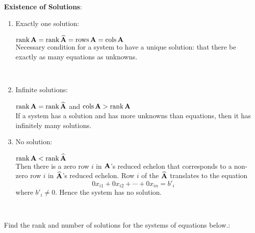 \documentclass[]{book}
\theoremstyle{definition}
\theoremstyle{definition}
\theoremstyle{definition}
\theoremstyle{remark}
\begin{document}
\textbf{Existence of Solutions}:

\begin{enumerate}
        \item \parbox[t]{1.75in}{Exactly one solution:}
            \parbox[t]{4in}{$\mbox{rank\,}{\bf A} = \mbox{rank\,} \widehat{\bf A}=\mbox{rows\,} {\bf A}  = \mbox{cols\,}{\bf A}$ \\
            [3pt] Necessary condition for a system to have a unique solution: that there be exactly as many equations as unknowns.}\\
    
        \item \parbox[t]{1.75in}{Infinite solutions:} \parbox[t]{4in}{$\mbox{rank\,} {\bf A}=\mbox{rank\,} \widehat{\bf A}$ and $\mbox{cols\,} {\bf A} > \mbox{rank\,} {\bf A}$\\
            [3pt] If a system has a solution and has more unknowns than equations, then it has infinitely many solutions.}

        \item \parbox[t]{1.75in}{No solution:} \parbox[t]{4in}{$\mbox{rank\,} {\bf A} < \mbox{rank\,} \widehat{\bf A}$ \\
        [3pt] Then there is a zero row $i$ in $\bf A$'s reduced echelon that corresponds to a non-zero row $i$ in $\widehat{\bf A}$'s reduced echelon.  Row $i$ of the $\widehat{\bf A}$ translates to the equation  $$0 x_{i1} + 0 x_{i2} + \cdots + 0 x_{in} = b'_{i}$$ where $b'_{i}\ne 0$.  Hence the system has no solution.}\\

\end{enumerate}

Find the rank and number of solutions for the systems of equations
below.:
\end{document}
